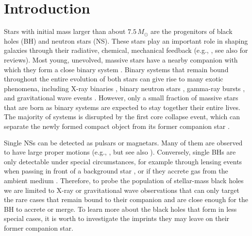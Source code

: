 \documentclass{aa}
\begin{document}
\maketitle{}

\section{Introduction}
\label{sec:intro}

Stars with initial mass larger than
about $7.5\,M_\odot$ are the progenitors of black holes (BH) and
neutron stars (NS). These stars play an important role in shaping galaxies
through their radiative, chemical, mechanical feedback
(e.g., \citealt{larson:74, Heger+2003, ceverino:09, lamers:13}, see
also \citealt{langer:12, nomoto:13} for reviews).
Most young, unevolved, massive stars have a nearby companion with
which they form a close binary system
\citep[e.g.,][]{kobulnicky:07,mason:09,sana:11,sana:12,kiminki:12,chini:12,kobulnicky:14,almeida:17,demarco:17}. 
Binary systems that remain bound throughout the entire evolution of both
stars can give rise to many exotic phenomena, including X-ray binaries
\citep[e.g., ][]{gott:71,Bolton1972, Webster+1972,
  van-den-Heuvel+1972}, binary neutron stars
\citep[e.g.,][]{hulse:75,wijers:92}, gamma-ray bursts
\citep[e.g.,][]{izzard:04b,becerra:16, LVC:17:grb}, and gravitational wave events
\citep{LVC:16b, BNSmerger:17}.  
However, only a small fraction of massive stars that are born as
binary systems are expected to stay together their entire lives. The
majority of systems is disrupted by the first core collapse event,
which can separate the newly formed compact object from its former
companion star
\citep[][]{zwicky:57,blaauw:61, tauris:98, belczynski:99,
  belczynski:08, eldridge:11}. 

Single NSs can be detected as pulsars or magnetars. Many of
them are observed to have large proper motions (e.g.,
\citealt{gunn:70,gott:70,lyne:94,kaspi:96,hobbs:05,chatterjee:05}, but see also \citealt{verbunt:17}).
Conversely, single BHs are only detectable under special
circumstances, for example through lensing events when passing in
front of a background star \citep[e.g.,][]{wyrzykowski:16}, or if they
accrete gas from the ambient medium
\citep[e.g.,][]{fender:13, gaggero:17}. Therefore, to probe the
population of stellar-mass black holes we are limited to X-ray or
gravitational wave observations that can only target the rare
cases that remain bound to their companion and are close enough for
the BH to accrete or merge. To learn more about the black holes that
form in less special cases, it is worth to investigate the imprints
they may leave on their former companion star. 
\end{document}
